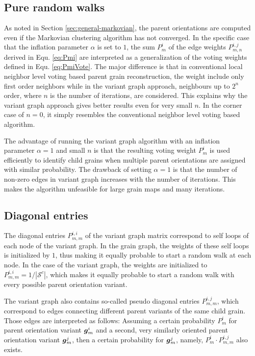 \documentclass{elsarticle}
\renewcommand{\vec}[1]{\ensuremath \mathbf{\boldsymbol{#1}}}
\numberwithin{equation}{section}
\begin{document}
\subsection{Pure random walks}
As noted in Section \ref{sec:general-markovian}, the parent orientations are computed even if the Markovian clustering algorithm has not converged. In the specific case that the inflation parameter $\alpha$ is set to $1$, the sum $P_m^i$ of the edge weights $P_{m,n}^{i,j}$ derived in Equ. \eqref{eq:Pmi} are interpreted as a generalization of the voting weights defined in Equ. \eqref{eq:PmiVote}. The major difference is that in conventional local neighbor level voting based parent grain reconstruction, the weight include only first order neighbors while in the variant graph approach, neighbours up to $2^n$ order, where $n$ is the number of iterations, are considered. This explains why the variant graph approach gives better results even for very small $n$. In the corner case of $n=0$, it simply resembles the conventional neighbor level voting based algorithm.

The advantage of running the variant graph algorithm with an inflation parameter $\alpha=1$ and small $n$ is that the resulting voting weight $P_m^i$ is used efficiently to identify child grains when multiple parent orientations are assigned with similar probability. The drawback of setting $\alpha=1$ is that the number of non-zero edges in variant graph increases with the number of iterations. This makes the algorithm unfeasible for large grain maps and many iterations.



\subsection{Diagonal entries} 
The diagonal entries $P_{m,m}^{i,i}$ of the variant graph matrix correspond to self loops of each node of the variant graph. In the grain graph, the weights of these self loops is initialized by $1$, thus making it equally probable to start a random walk at each node. In the case of the variant graph, the weights are initialized to $P_{m,m}^{i,i} = 1/|\mathcal S^c|$, which makes it equally probable to start a random walk with every possible parent orientation variant.

The variant graph also contains so-called pseudo diagonal entries $P_{m,m}^{i,j}$, which correspond to edges connecting different parent variants of the same child grain. Those edges are interpreted as follows: Assuming a certain probability $P_m^i$ for parent orientation variant $\vec g_m^i$ and a second, very similarly oriented parent orientation variant $\vec g_m^j$, then a certain probability for $\vec g_m^j$, namely, $P_m^i \cdot P_{m,m}^{i,j}$ also exists.
\end{document}

